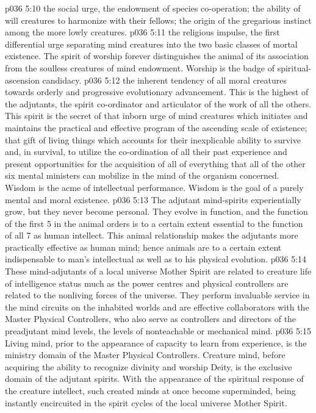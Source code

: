 \vs p036 5:10 \bibnobreakspace {} the social urge, the endowment of species co\hyp{}operation; the ability of will creatures to harmonize with their fellows; the origin of the gregarious instinct among the more lowly creatures.
\vs p036 5:11 \bibnobreakspace {} the religious impulse, the first differential urge separating mind creatures into the two basic classes of mortal existence. The spirit of worship forever distinguishes the animal of its association from the soulless creatures of mind endowment. Worship is the badge of spiritual\hyp{}ascension candidacy.
\vs p036 5:12 \bibnobreakspace {} the inherent tendency of all moral creatures towards orderly and progressive evolutionary advancement. This is the highest of the adjutants, the spirit co\hyp{}ordinator and articulator of the work of all the others. This spirit is the secret of that inborn urge of mind creatures which initiates and maintains the practical and effective program of the ascending scale of existence; that gift of living things which accounts for their inexplicable ability to survive and, in survival, to utilize the co\hyp{}ordination of all their past experience and present opportunities for the acquisition of all of everything that all of the other six mental ministers can mobilize in the mind of the organism concerned. Wisdom is the acme of intellectual performance. Wisdom is the goal of a purely mental and moral existence.
\vs p036 5:13 \pc The adjutant mind\hyp{}spirits experientially grow, but they never become personal. They evolve in function, and the function of the first 5 in the animal orders is to a certain extent essential to the function of all 7 as human intellect. This animal relationship makes the adjutants more practically effective as human mind; hence animals are to a certain extent indispensable to man’s intellectual as well as to his physical evolution.
\vs p036 5:14 These mind\hyp{}adjutants of a local universe Mother Spirit are related to creature life of intelligence status much as the power centres and physical controllers are related to the nonliving forces of the universe. They perform invaluable service in the mind circuits on the inhabited worlds and are effective collaborators with the Master Physical Controllers, who also serve as controllers and directors of the preadjutant mind levels, the levels of nonteachable or mechanical mind.
\vs p036 5:15 Living mind, prior to the appearance of capacity to learn from experience, is the ministry domain of the Master Physical Controllers. Creature mind, before acquiring the ability to recognize divinity and worship Deity, is the exclusive domain of the adjutant spirits. With the appearance of the spiritual response of the creature intellect, such created minds at once become superminded, being instantly encircuited in the spirit cycles of the local universe Mother Spirit.
